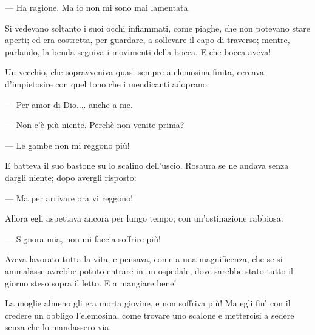 — Ha ragione. Ma io non mi sono mai lamentata.

Si vedevano soltanto i suoi occhi infiammati, come piaghe, che non potevano stare aperti; ed era costretta, per guardare, a sollevare il capo di traverso; mentre, parlando, la benda seguiva i movimenti della bocca. E che bocca aveva!

Un vecchio, che sopravveniva quasi sempre a elemosina finita, cercava d’impietosire con quel tono che i mendicanti adoprano:

— Per amor di Dio.... anche a me.

— Non c’è più niente. Perchè non venite prima?

— Le gambe non mi reggono più!

E batteva il suo bastone su lo scalino dell’uscio. Rosaura se ne andava senza dargli niente; dopo avergli risposto:

— Ma per arrivare ora vi reggono!

Allora egli aspettava ancora per lungo tempo; con un’ostinazione rabbiosa:

— Signora mia, non mi faccia soffrire più!

Aveva lavorato tutta la vita; e pensava, come a una magnificenza, che se si ammalasse avrebbe potuto entrare in un ospedale, dove sarebbe stato tutto il giorno steso sopra il letto. E a mangiare bene!

La moglie almeno gli era morta giovine, e non soffriva più! Ma egli finì con il credere un obbligo l’elemosina, come trovare uno scalone e mettercisi a sedere senza che lo mandassero via.
